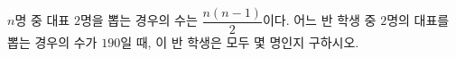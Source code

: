$n$명 중 대표 $2$명을 뽑는 경우의 수는 $\dfrac{n(n-1)}{2}$이다. 어느 반 학생 중 $2$명의 대표를 뽑는 경우의 수가 $190$일 때, 이 반 학생은 모두 몇 명인지 구하시오.
